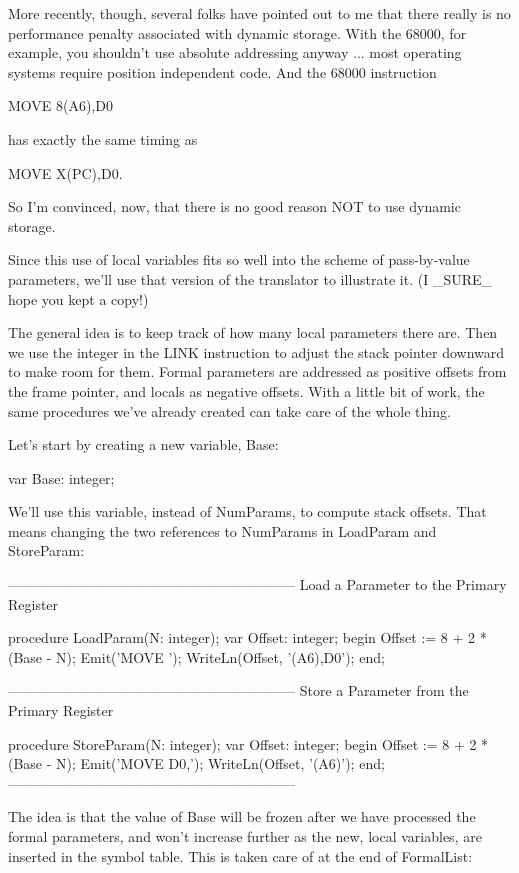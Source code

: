 \documentclass[float=false, crop=false]{standalone}
\begin{document}
More recently, though, several folks have pointed out to me that there really is
no performance penalty associated with dynamic storage. With the 68000, for
example, you shouldn't use absolute addressing anyway ... most operating systems
require position independent code. And the 68000 instruction

     MOVE 8(A6),D0

has exactly the same timing as

     MOVE X(PC),D0.

So I'm convinced, now, that there is no good reason NOT to use dynamic storage.

Since this use of local variables fits so well into the scheme of pass-by-value
parameters, we'll use that version of the translator to illustrate it. (I _SURE_
hope you kept a copy!)

The general idea is to keep track of how many local parameters there are. Then
we use the integer in the LINK instruction to adjust the stack pointer downward
to make room for them. Formal parameters are addressed as positive offsets from
the frame pointer, and locals as negative offsets. With a little bit of work,
the same procedures we've already created can take care of the whole thing.

Let's start by creating a new variable, Base:


     var Base: integer;

We'll use this variable, instead of NumParams, to compute stack offsets. That
means changing the two references to NumParams in LoadParam and StoreParam:


{--------------------------------------------------------------}
{ Load a Parameter to the Primary Register }

procedure LoadParam(N: integer);
var Offset: integer;
begin
     Offset := 8 + 2 * (Base - N);
     Emit('MOVE ');
     WriteLn(Offset, '(A6),D0');
end;


{--------------------------------------------------------------}
{ Store a Parameter from the Primary Register }

procedure StoreParam(N: integer);
var Offset: integer;
begin
     Offset := 8 + 2 * (Base - N);
     Emit('MOVE D0,');
     WriteLn(Offset, '(A6)');
end;
{--------------------------------------------------------------}


The idea is that the value of Base will be frozen after we have processed the
formal parameters, and won't increase further as the new, local variables, are
inserted in the symbol table. This is taken care of at the end of FormalList:
\end{document}
